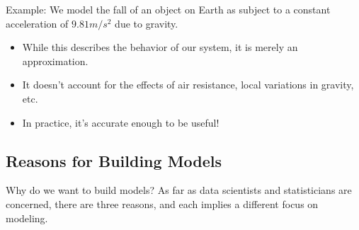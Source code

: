 \documentclass[
  letterpaper,
  DIV=11,
  numbers=noendperiod]{scrreprt}
\providecommand{\tightlist}{%
  \setlength{\itemsep}{0pt}\setlength{\parskip}{0pt}}\usepackage{longtable,booktabs,array}
\begin{document}
Example: We model the fall of an object on Earth as subject to a
constant acceleration of \(9.81 m/s^2\) due to gravity.

\begin{itemize}
\tightlist
\item
  While this describes the behavior of our system, it is merely an
  approximation.
\item
  It doesn't account for the effects of air resistance, local variations
  in gravity, etc.
\item
  In practice, it's accurate enough to be useful!
\end{itemize}

\subsection{Reasons for Building
Models}\label{reasons-for-building-models}

Why do we want to build models? As far as data scientists and
statisticians are concerned, there are three reasons, and each implies a
different focus on modeling.
\end{document}
